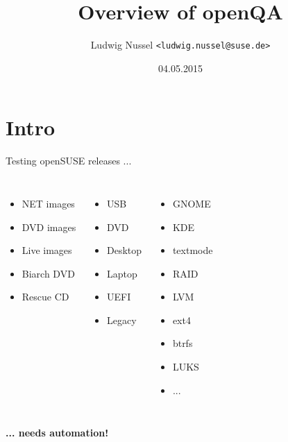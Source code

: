 \documentclass[
]{beamer}
\title{Overview of openQA}
\author[Ludwig Nussel]{Ludwig Nussel \texttt{<ludwig.nussel@suse.de>}}
\date{04.05.2015}
\institute[SUSE]{SUSE Linux GmbH}
\begin{document}
{
  \usebackgroundtemplate{}
  \begin{frame}[plain]
    
  \end{frame}
}


\section{Intro}
\begin{frame}{Testing openSUSE releases ...}
  \begin{columns}[T]
    \begin{itemize}
      \item NET images
      \item DVD images
      \item Live images
      \item Biarch DVD
      \item Rescue CD
    \end{itemize}
    \pause
    \begin{itemize}
      \item USB
      \item DVD
      \item Desktop
      \item Laptop
      \item UEFI
      \item Legacy
    \end{itemize}
    \pause
    \begin{itemize}
      \item GNOME
      \item KDE
      \item textmode
      \item RAID
      \item LVM
      \item ext4
      \item btrfs
      \item LUKS
      \item ...
    \end{itemize}
  \end{columns}
  \pause
  \textbf{... needs automation!}
\end{frame}
\end{document}
